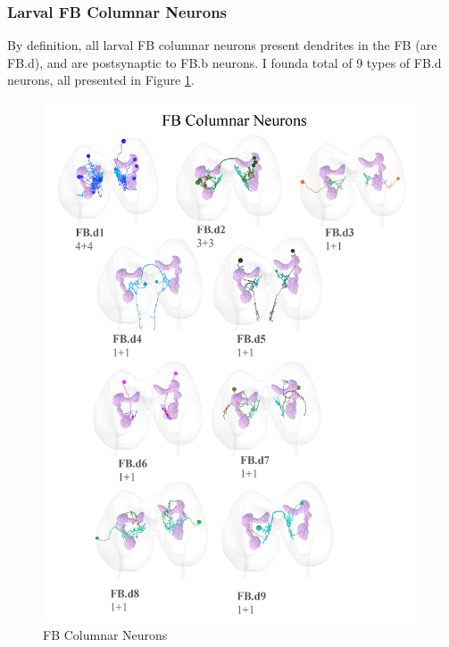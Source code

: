         \subsubsection{Larval FB Columnar Neurons}


            By definition, all larval FB columnar neurons present dendrites in the FB (are FB.d), and are postsynaptic to FB.b neurons. I founda total of 9 types of FB.d neurons, all presented in Figure \ref{FBColumnar}. 

            \begin{figure}
                \centering
                \includegraphics[width=15cm]{Figs/CX/FBColumnar.pdf}
                \caption[FB Columnar Neurons]{FB Columnar Neurons}
                \label{FBColumnar}
            \end{figure}


